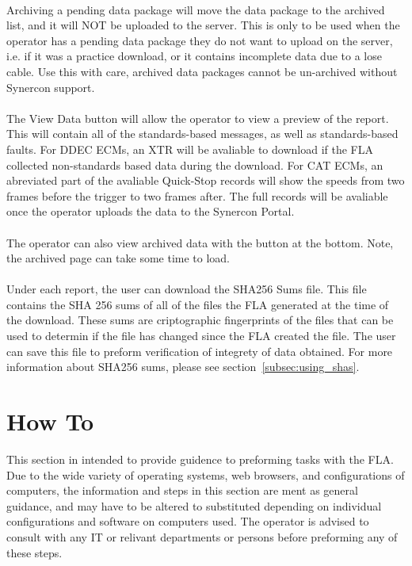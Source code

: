 \documentclass[11pt]{article}
\begin{document}
\paragraph{  }
Archiving a pending data package will move the data package to the archived list, and it will NOT be uploaded to the server. This is only to be used when the operator has a pending data package they do not want to upload on the server, i.e. if it was a practice download, or it contains incomplete data due to a lose cable. Use this with care, archived data packages cannot be un-archived without Synercon support.
\paragraph{  }
The View Data button will allow the operator to view a preview of the report. This will contain all of the standards-based messages, as well as standards-based faults. For DDEC ECMs, an XTR will be avaliable to download if the FLA collected non-standards based data during the download. For CAT ECMs, an abreviated part of the avaliable Quick-Stop records will show the speeds from two frames before the trigger to two frames after. The full records will be avaliable once the operator uploads the data to the Synercon Portal.
\paragraph{  }
The operator can also view archived data with the button at the bottom. Note, the archived page can take some time to load.
\paragraph{  }
Under each report, the user can download the SHA256 Sums file. This file contains the SHA 256 sums of all of the files the FLA generated at the time of the download. These sums are criptographic fingerprints of the files that can be used to determin if the file has changed since the FLA created the file. The user can save this file to preform verification of integrety of data obtained. For more information about SHA256 sums, please see section~\ref{subsec:using_shas}.

\section{How To}
This section in intended to provide guidence to preforming tasks with the FLA. Due to the wide variety of operating systems, web browsers, and configurations of computers, the information and steps in this section are ment as general guidance, and may have to be altered to substituted depending on individual configurations and software on computers used. The operator is advised to consult with any IT or relivant departments or persons before preforming any of these steps.
\end{document}
